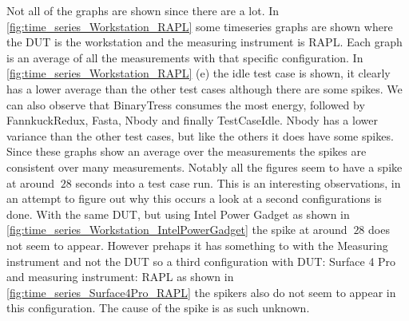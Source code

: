 Not all of the graphs are shown since there are a lot. In \cref{fig:time_series_Workstation_RAPL} some timeseries graphs are shown where the DUT is the workstation and the measuring instrument is RAPL. Each graph is an average of all the measurements with that specific configuration. In \cref{fig:time_series_Workstation_RAPL} (e) the idle test case is shown, it clearly has a lower average than the other test cases although there are some spikes. We can also observe that BinaryTress consumes the most energy, followed by FannkuckRedux, Fasta, Nbody and finally TestCaseIdle. Nbody has a lower variance than the other test cases, but like the others it does have some spikes. Since these graphs show an average over the measurements the spikes are consistent over many measurements. Notably all the figures seem to have a spike at around $~28$ seconds into a test case run. This is an interesting observations, in an attempt to figure out why this occurs a look at a second configurations is done. With the same DUT, but using Intel Power Gadget as shown in \cref{fig:time_series_Workstation_IntelPowerGadget} the spike at around $~28$ does not seem to appear. However prehaps it has something to with the Measuring instrument and not the DUT so a third configuration with DUT: Surface 4 Pro and measuring instrument: RAPL as shown in \cref{fig:time_series_Surface4Pro_RAPL} the spikers also do not seem to appear in this configuration. The cause of the spike is as such unknown. 







%










